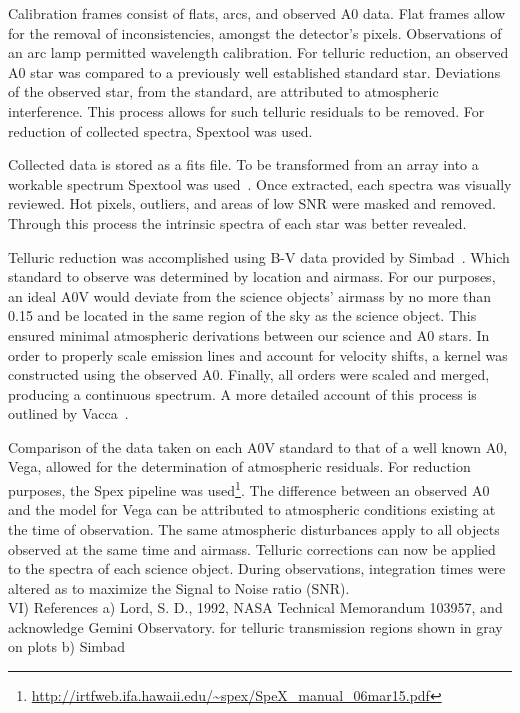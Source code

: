 
Calibration frames consist of flats, arcs, and observed A0 data.  Flat frames allow for the removal of inconsistencies, amongst the detector's pixels.  Observations of an arc lamp permitted wavelength calibration.  For telluric reduction, an observed A0 star was compared to a previously well established standard star.  Deviations of the observed star, from the standard, are attributed to atmospheric interference.  This process allows for such telluric residuals to be removed.  For reduction of collected spectra, Spextool was used.





Collected data is stored as a fits file.  To be transformed from an array into a workable spectrum Spextool was used~\cite{Cushing_2004}.  Once extracted, each spectra was visually reviewed.  Hot pixels, outliers, and areas of low SNR were masked and removed.  Through this process the intrinsic spectra of each star was better revealed.


Telluric reduction was accomplished using B-V data provided by Simbad~\cite{simbad}.  Which standard to observe was determined by location and airmass.  For our purposes, an ideal A0V would deviate from the science objects' airmass by no more than 0.15 and be located in the same region of the sky as the science object.  This ensured minimal atmospheric derivations between our science and A0 stars.
In order to properly scale emission lines and account for velocity shifts, a kernel was constructed using the observed A0.  Finally, all orders were scaled and merged, producing a continuous spectrum.
A more detailed account of this process is outlined by Vacca~\cite{Vacca_2003}. 



Comparison of the data taken on each A0V standard to that of a well known A0, Vega, allowed for the determination of atmospheric residuals.  %
For reduction purposes, the Spex pipeline was used\footnote{\url{http://irtfweb.ifa.hawaii.edu/~spex/SpeX_manual_06mar15.pdf}}.  The difference between an observed A0 and the model for Vega can be attributed to atmospheric conditions existing at the time of observation.  The same atmospheric disturbances apply to all objects observed at the same time and airmass.  Telluric corrections can now be applied to the spectra of each science object.  During observations, integration times were altered as to maximize the Signal to Noise ratio (SNR). \cite{Cushing_2004}\\


VI) References
  a) Lord, S. D., 1992, NASA Technical Memorandum 103957, and acknowledge Gemini Observatory.
  for telluric transmission regions shown in gray on plots
  b) Simbad
  
  
  
  




